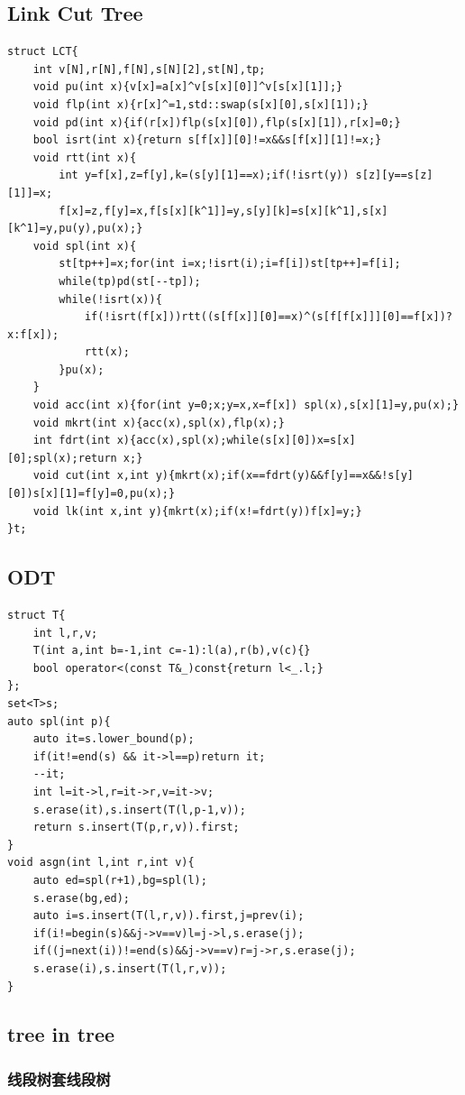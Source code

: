 \documentclass[UTF8, a4paper, titlepage, twoside]{ctexart}
\begin{document}
\subsection{ Link Cut Tree }
\begin{lstlisting}[style=cpp]
struct LCT{
    int v[N],r[N],f[N],s[N][2],st[N],tp;
    void pu(int x){v[x]=a[x]^v[s[x][0]]^v[s[x][1]];}
    void flp(int x){r[x]^=1,std::swap(s[x][0],s[x][1]);}
    void pd(int x){if(r[x])flp(s[x][0]),flp(s[x][1]),r[x]=0;}
    bool isrt(int x){return s[f[x]][0]!=x&&s[f[x]][1]!=x;}
    void rtt(int x){
        int y=f[x],z=f[y],k=(s[y][1]==x);if(!isrt(y)) s[z][y==s[z][1]]=x;
        f[x]=z,f[y]=x,f[s[x][k^1]]=y,s[y][k]=s[x][k^1],s[x][k^1]=y,pu(y),pu(x);}
    void spl(int x){
        st[tp++]=x;for(int i=x;!isrt(i);i=f[i])st[tp++]=f[i];
        while(tp)pd(st[--tp]);
        while(!isrt(x)){
            if(!isrt(f[x]))rtt((s[f[x]][0]==x)^(s[f[f[x]]][0]==f[x])?x:f[x]);
            rtt(x);
        }pu(x);
    }
    void acc(int x){for(int y=0;x;y=x,x=f[x]) spl(x),s[x][1]=y,pu(x);}
    void mkrt(int x){acc(x),spl(x),flp(x);}
    int fdrt(int x){acc(x),spl(x);while(s[x][0])x=s[x][0];spl(x);return x;}
    void cut(int x,int y){mkrt(x);if(x==fdrt(y)&&f[y]==x&&!s[y][0])s[x][1]=f[y]=0,pu(x);}
    void lk(int x,int y){mkrt(x);if(x!=fdrt(y))f[x]=y;}
}t;
\end{lstlisting}

\subsection{ ODT }
\begin{lstlisting}[style=cpp]
struct T{
    int l,r,v;
    T(int a,int b=-1,int c=-1):l(a),r(b),v(c){}
    bool operator<(const T&_)const{return l<_.l;}
};
set<T>s;
auto spl(int p){
    auto it=s.lower_bound(p);
    if(it!=end(s) && it->l==p)return it;
    --it;
    int l=it->l,r=it->r,v=it->v;
    s.erase(it),s.insert(T(l,p-1,v));
    return s.insert(T(p,r,v)).first;
}
void asgn(int l,int r,int v){
    auto ed=spl(r+1),bg=spl(l);
    s.erase(bg,ed);
    auto i=s.insert(T(l,r,v)).first,j=prev(i);
    if(i!=begin(s)&&j->v==v)l=j->l,s.erase(j);
    if((j=next(i))!=end(s)&&j->v==v)r=j->r,s.erase(j);
    s.erase(i),s.insert(T(l,r,v));
}
\end{lstlisting}

\subsection{ tree in tree }
\subsubsection*{ 线段树套线段树 }
\end{document}
